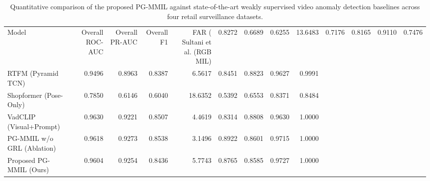 \begin{table}
\caption{Quantitative comparison of the proposed PG-MMIL against state-of-the-art weakly supervised video anomaly detection baselines across four retail surveillance datasets.}
\label{tab:sota_comparison}
\begin{tabular}{lrrrrrrrr}
\toprule
Model & Overall ROC-AUC & Overall PR-AUC & Overall F1 & FAR (%
\midrule
Sultani et al. (RGB MIL) & 0.8272 & 0.6689 & 0.6255 & 13.6483 & 0.7176 & 0.8165 & 0.9110 & 0.7476 \\
RTFM (Pyramid TCN) & 0.9496 & 0.8963 & 0.8387 & 6.5617 & 0.8451 & 0.8823 & 0.9627 & 0.9991 \\
Shopformer (Pose-Only) & 0.7850 & 0.6146 & 0.6040 & 18.6352 & 0.5392 & 0.6553 & 0.8371 & 0.8484 \\
VadCLIP (Visual+Prompt) & 0.9630 & 0.9221 & 0.8507 & 4.4619 & 0.8314 & 0.8808 & 0.9630 & 1.0000 \\
PG-MMIL w/o GRL (Ablation) & 0.9618 & 0.9273 & 0.8538 & 3.1496 & 0.8922 & 0.8601 & 0.9715 & 1.0000 \\
Proposed PG-MMIL (Ours) & 0.9604 & 0.9254 & 0.8436 & 5.7743 & 0.8765 & 0.8585 & 0.9727 & 1.0000 \\
\bottomrule
\end{tabular}
\end{table}
